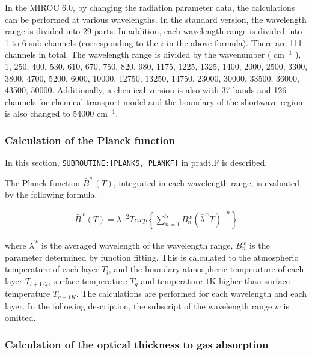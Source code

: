 In the MIROC 6.0, by changing the radiation parameter data, the calculations can be performed at various wavelengths. In the standard version, the wavelength range is divided into 29 parts. In
addition, each wavelength range is divided into 1 to 6 sub-channels (corresponding to the \(i\) in the above formula). There are 111 channels in total. The wavelength range is divided by the
wavenumber ( \(\mathrm{cm}^{-1}\) ), 1, 250, 400, 530, 610, 670, 750, 820, 980, 1175, 1225, 1325, 1400, 2000, 2500, 3300, 3800, 4700, 5200, 6000, 10000, 12750, 13250, 14750, 23000, 30000, 33500,
36000, 43500, 50000. Additionally, a chemical version is also with 37 bands and 126 channels for chemical transport model and the boundary of the shortwave region is also changed to 54000
\(\mathrm{cm}^{-1}\).

\hypertarget{calculation-of-the-planck-function}{%
\subsubsection{Calculation of the Planck function}\label{calculation-of-the-planck-function}}

In this section, \texttt{SUBROUTINE:{[}PLANKS,\ PLANKF{]}} in pradt.F is described.

The Planck function \(\bar{B}^{w}(T)\), integrated in each wavelength range, is evaluated by the following formula.

\begin{eqnarray}
\bar{B}^{w}(T)=\lambda^{-2}{Texp}\left\{\sum_{n=1}^{5} B_{n}^{w}\left(\bar{\lambda}^{w} T\right)^{-n}\right\}
\end{eqnarray}

where \(\bar{\lambda}^{w}\) is the averaged wavelength of the wavelength range, \(B_{n}^{w}\) is the parameter determined by function fitting. This is calculated to the atmospheric temperature of each
layer \(T_l\), and the boundary atmospheric temperature of each layer \(T_{l+1/2}\), surface temperature \(T_g\) and temperature \(1\mathrm{K}\) higher than surface temperature \(T_{g+1K}\). The
calculations are performed for each wavelength and each layer. In the following description, the subscript of the wavelength range \(w\) is omitted.

\hypertarget{calculation-of-the-optical-thickness-to-gas-absorption}{%
\subsubsection{Calculation of the optical thickness to gas absorption}\label{calculation-of-the-optical-thickness-to-gas-absorption}}

